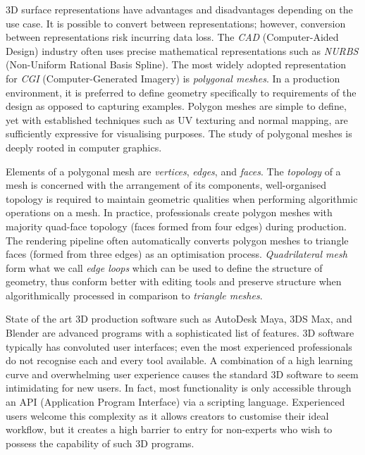 \documentclass[ %
author={Dillon Keith Diep},
supervisor={Dr. Carl Henrik Ek},
degree={MEng},
title={ART-CG Hair:},
subtitle={Assisted Real-time Content Generation of Stylised Virtual Hair},
type={Research},
year={2017} ]{dissertation}
\begin{document}
	3D surface representations have advantages and disadvantages depending on the use case. It is possible to convert between representations; however, conversion between representations risk incurring data loss. The \textit{CAD} (Computer-Aided Design) industry often uses precise mathematical representations such as \textit{NURBS} (Non-Uniform Rational Basis Spline). The most widely adopted representation for \textit{CGI} (Computer-Generated Imagery) is \textit{polygonal meshes}. In a production environment, it is preferred to define geometry specifically to requirements of the design as opposed to capturing examples. Polygon meshes are simple to define, yet with established techniques such as UV texturing and normal mapping, are sufficiently expressive for visualising purposes. The study of polygonal meshes is deeply rooted in computer graphics.
	
	Elements of a polygonal mesh are \textit{vertices}, \textit{edges}, and \textit{faces}. The \textit{topology} of a mesh is concerned with the arrangement of its components, well-organised topology is required to maintain geometric qualities when performing algorithmic operations on a mesh. In practice, professionals create polygon meshes with majority quad-face topology (faces formed from four edges) during production. The rendering pipeline often automatically converts polygon meshes to triangle faces (formed from three edges) as an optimisation process. \textit{Quadrilateral mesh} form what we call \textit{edge loops} which can be used to define the structure of geometry, thus conform better with editing tools and preserve structure when algorithmically processed in comparison to \textit{triangle meshes}.
	
	State of the art 3D production software such as AutoDesk Maya, 3DS Max, and Blender are advanced programs with a sophisticated list of features. 3D software typically has convoluted user interfaces; even the most experienced professionals do not recognise each and every tool available. A combination of a high learning curve and overwhelming user experience causes the standard 3D software to seem intimidating for new users. In fact, most functionality is only accessible through an API (Application Program Interface) via a scripting language.  Experienced users welcome this complexity as it allows creators to customise their ideal workflow, but it creates a high barrier to entry for non-experts who wish to possess the capability of such 3D programs.
	
	
\end{document}
